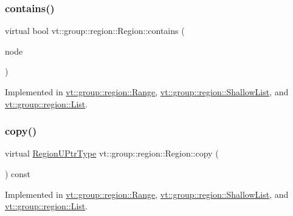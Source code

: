 \subsubsection{\texorpdfstring{contains()}{contains()}}
{\footnotesize\ttfamily virtual bool vt\+::group\+::region\+::\+Region\+::contains (\begin{DoxyParamCaption}\item[{\hyperlink{namespacevt_a866da9d0efc19c0a1ce79e9e492f47e2}{Node\+Type} const \&}]{node }\end{DoxyParamCaption})\hspace{0.3cm}{\ttfamily [pure virtual]}}



Implemented in \hyperlink{structvt_1_1group_1_1region_1_1_range_a1e8b87b37b06d3803fd3b287fde3564b}{vt\+::group\+::region\+::\+Range}, \hyperlink{structvt_1_1group_1_1region_1_1_shallow_list_a58313e5cab61f196ff5fb1d6ac109d1c}{vt\+::group\+::region\+::\+Shallow\+List}, and \hyperlink{structvt_1_1group_1_1region_1_1_list_ac85ec02f77a44a2dadc1b51231e113a7}{vt\+::group\+::region\+::\+List}.

\mbox{\label{structvt_1_1group_1_1region_1_1_region_a040d20a4f8c6fa351d7fe1cbfcae3a03}} 
\subsubsection{\texorpdfstring{copy()}{copy()}}
{\footnotesize\ttfamily virtual \hyperlink{structvt_1_1group_1_1region_1_1_region_ae5f42cf159116a3cf8bd65423eb01037}{Region\+U\+Ptr\+Type} vt\+::group\+::region\+::\+Region\+::copy (\begin{DoxyParamCaption}{ }\end{DoxyParamCaption}) const\hspace{0.3cm}{\ttfamily [pure virtual]}}



Implemented in \hyperlink{structvt_1_1group_1_1region_1_1_range_a9b7985ec60471524e11bb933fd0f6821}{vt\+::group\+::region\+::\+Range}, \hyperlink{structvt_1_1group_1_1region_1_1_shallow_list_a43434547454d02f9069873282675058f}{vt\+::group\+::region\+::\+Shallow\+List}, and \hyperlink{structvt_1_1group_1_1region_1_1_list_ac5885572f4cd651003cd6012ba247cda}{vt\+::group\+::region\+::\+List}.

